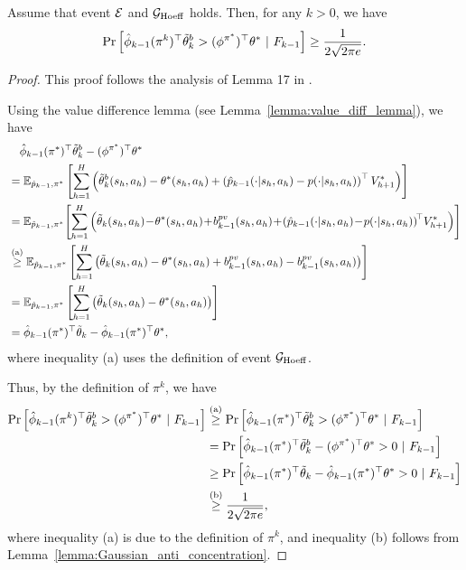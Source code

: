 \begin{lemma} \label{lemma:ts_optimism}
	Assume that event $\mathcal{E}$ and $\mathcal{G}_{\textup{Hoeff}}$ holds. Then, for any $k>0$, we have
	\begin{align*}
		\Pr\left[  \hat{\phi}_{k-1}(\pi^k)^\top \tilde{\theta}^{b}_k > (\phi^{\pi^*})^\top \theta^* \ |\ F_{k-1}  \right] \geq \frac{1}{2\sqrt{2\pi e}} .
	\end{align*}
\end{lemma}
\begin{proof}
	This proof follows the analysis of Lemma 17 in \cite{efroni2021reinforcement}.
	
	Using the value difference lemma (see Lemma~\ref{lemma:value_diff_lemma}), we have
	\begin{align*}
		&\quad \hat{\phi}_{k-1}(\pi^*)^\top \tilde{\theta}^{b}_k - (\phi^{\pi^*})^\top \theta^*
		\\
		&= \ex_{\hat{p}_{k-1},\pi^*} \mbr{ \sum_{h=1}^{H} \sbr{ \tilde{\theta}^{b}_k(s_h,a_h) - \theta^*(s_h,a_h)  + \sbr{ \hat{p}_{k-1}(\cdot|s_h,a_h) - p(\cdot|s_h,a_h) }^\top V^*_{h+1} } }
		\\
		&= \ex_{\hat{p}_{k-1},\pi^*} \!\mbr{ \sum_{h=1}^{H} \sbr{ \tilde{\theta}_k(s_h,a_h) \!-\! \theta^*(s_h,a_h) \!+\! b^{pv}_{k-1}(s_h,a_h)  \!+\! \sbr{ \hat{p}_{k-1}(\cdot|s_h,a_h) \!-\! p(\cdot|s_h,a_h) }^{\!\top} \! V^*_{h+1} } }
		\\
		&\overset{\textup{(a)}}{\geq} \ex_{\hat{p}_{k-1},\pi^*} \mbr{ \sum_{h=1}^{H} \sbr{ \tilde{\theta}_k(s_h,a_h) - \theta^*(s_h,a_h) + b^{pv}_{k-1}(s_h,a_h) - b^{pv}_{k-1}(s_h,a_h) } }
		\\
		&= \ex_{\hat{p}_{k-1},\pi^*} \mbr{ \sum_{h=1}^{H} \sbr{ \tilde{\theta}_k(s_h,a_h) - \theta^*(s_h,a_h) } }
		\\
		&= \hat{\phi}_{k-1}(\pi^*)^\top \tilde{\theta}_k - \hat{\phi}_{k-1}(\pi^*)^\top \theta^* ,
	\end{align*}
	where inequality (a) uses the definition of event $\mathcal{G}_{\textup{Hoeff}}$.
	
	Thus, by the definition of $\pi^k$, we have
	\begin{align*}
		\Pr \mbr{\hat{\phi}_{k-1}(\pi^k)^\top \tilde{\theta}^{b}_k > (\phi^{\pi^*})^\top \theta^* \ |\ F_{k-1}} &\overset{\textup{(a)}}{\geq} \Pr \mbr{\hat{\phi}_{k-1}(\pi^*)^\top \tilde{\theta}^{b}_k > (\phi^{\pi^*})^\top \theta^* \ |\ F_{k-1}}
		\\
		&= \Pr \mbr{\hat{\phi}_{k-1}(\pi^*)^\top \tilde{\theta}^{b}_k - (\phi^{\pi^*})^\top \theta^* > 0 \ |\ F_{k-1}}
		\\
		&\geq \Pr \mbr{ \hat{\phi}_{k-1}(\pi^*)^\top \tilde{\theta}_k - \hat{\phi}_{k-1}(\pi^*)^\top \theta^* >0 \ |\ F_{k-1}}
		\\
		&\overset{\textup{(b)}}{\geq} \frac{1}{2\sqrt{2\pi e}} ,
	\end{align*}
	where inequality (a) is due to the definition of $\pi^k$, and inequality (b) follows from Lemma~\ref{lemma:Gaussian_anti_concentration}.
\end{proof}






